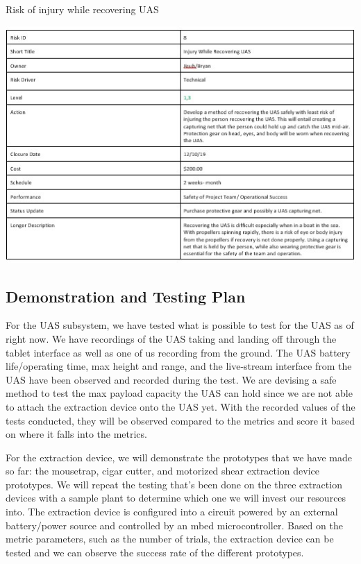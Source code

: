 \documentclass{wrcecapstone}
\begin{document}
\begin{table}
\caption{Risk of injury while recovering UAS}
\label{tab:8.3.1i}
\includegraphics[width=\columnwidth]{figures/table-831i.jpg}
\end{table}









\subsection{Demonstration and Testing Plan}
For the UAS subsystem, we have tested what is possible to test for the UAS as of right now. We have recordings of the UAS taking and landing off through the tablet interface as well as one of us recording from the ground. The UAS battery life/operating time, max height and range, and the live-stream interface from the UAS have been observed and recorded during the test. We are devising a safe method to test the max payload capacity the UAS can hold since we are not able to attach the extraction device onto the UAS yet. With the recorded values of the tests conducted, they will be observed compared to the metrics and score it based on where it falls into the metrics.

For the extraction device, we will demonstrate the prototypes that we have made so far: the mousetrap, cigar cutter, and motorized shear extraction device prototypes. We will repeat the testing that’s been done on the three extraction devices with a sample plant to determine which one we will invest our resources into. The extraction device is configured into a circuit powered by an external battery/power source and controlled by an mbed microcontroller. Based on the metric parameters, such as the number of trials, the extraction device can be tested and we can observe the success rate of the different prototypes.
\end{document}
